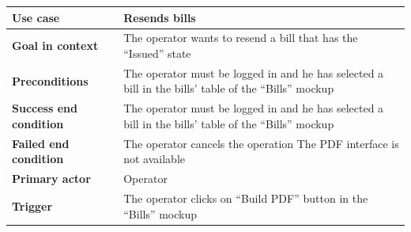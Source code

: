 {{{			\begin{table}[h]
			\begin{tabular}{|p{4cm}|p{10cm}|}
			\hline
				\centering \vspace{1mm} \bfseries{Use case} \vspace{1mm} & 
				\vspace{1mm} Resends bills\vspace{1mm}\\
			\hline
				\centering \vspace{1mm} \bfseries{Goal in context} \vspace{1mm} & 
				\vspace{1mm}The operator wants to resend a bill that has the “Issued” state \vspace{1mm}\\
			\hline
				\centering \vspace{1mm} \bfseries{Preconditions} \vspace{1mm} & 
				\vspace{1mm} The operator must be logged in and he has selected a bill in the bills’ table of the “Bills” mockup\vspace{1mm}\\
			\hline
				\centering \vspace{1mm} \bfseries{Success end condition} \vspace{1mm} & 
				\vspace{1mm}The operator must be logged in and he has selected a bill in the bills’ table of the “Bills” mockup \vspace{1mm}\\
			\hline
				\centering \vspace{1mm} \bfseries{Failed end condition} \vspace{1mm} & 
				\vspace{1mm}The operator cancels the operation The PDF interface is not available \vspace{1mm}\\
			\hline
				\centering \vspace{1mm} \bfseries{Primary actor} \vspace{1mm} & 
				\vspace{1mm} Operator \vspace{1mm}\\
			\hline
				\centering \vspace{1mm} \bfseries{Trigger} \vspace{1mm} & 
				\vspace{1mm} The operator clicks on “Build PDF” button in the “Bills” mockup \vspace{1mm}\\
			\hline
			\end{tabular}
			\end{table}

}}}
